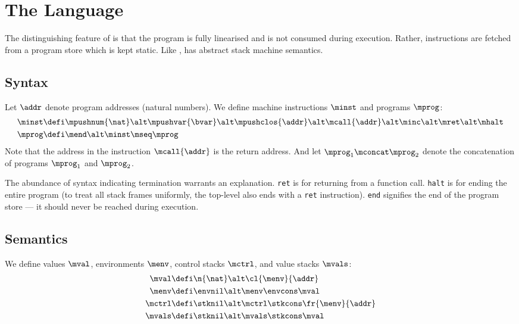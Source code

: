 \section{The \textnormal{\mlang} Language}

The distinguishing feature of \mlang is that the program is fully linearised and is not consumed during execution.
Rather, instructions are fetched from a program store which is kept static.
Like \slang, \mlang has abstract stack machine semantics.

\subsection{Syntax}

Let $\addr$ denote program addresses (natural numbers).
We define machine instructions $\minst$ and programs $\mprog$:
\begin{align*}
  \minst &\defi \mpushnum{\nat} \alt \mpushvar{\bvar} \alt \mpushclos{\addr} \alt \mcall{\addr} \alt \minc \alt \mret \alt \mhalt \\
  \mprog &\defi \mend \alt \minst \mseq \mprog
\end{align*}
Note that the address in the instruction $\mcall{\addr}$ is the return address.
And let $\mprog_1 \mconcat \mprog_2$ denote the concatenation of programs $\mprog_1$ and $\mprog_2$.

The abundance of syntax indicating termination warrants an explanation.
\texttt{ret} is for returning from a function call.
\texttt{halt} is for ending the entire program (to treat all stack frames uniformly, the top-level also ends with a \texttt{ret} instruction).
\texttt{end} signifies the end of the program store --- it should never be reached during execution.


\subsection{Semantics}

We define values $\mval$, environments $\menv$, control stacks $\mctrl$, and value stacks $\mvals$:
\begin{align*}
  \mval &\defi \n{\nat} \alt \cl{\menv}{\addr} \\
  \menv &\defi \envnil \alt \menv \envcons \mval \\
  \mctrl &\defi \stknil \alt \mctrl \stkcons \fr{\menv}{\addr} \\
  \mvals &\defi \stknil \alt \mvals \stkcons \mval
\end{align*}

